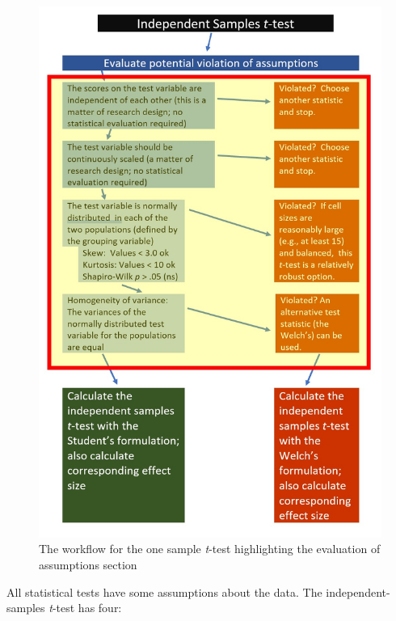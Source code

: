 \documentclass[
  11pt,
]{book}
\begin{document}
\begin{figure}
\centering
\includegraphics{images/ttests/IndSampleAssmptns.jpg}
\caption{The workflow for the one sample \emph{t}-test highlighting the evaluation of assumptions section}
\end{figure}

All statistical tests have some assumptions about the data. The independent-samples \emph{t}-test has four:
\end{document}
